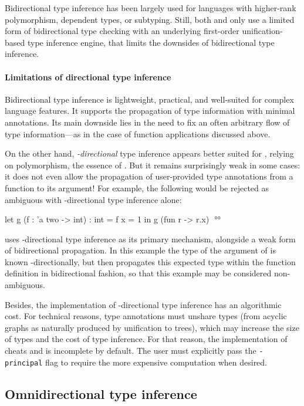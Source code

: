\documentclass[acmsmall,screen,nonacm,review]{acmart}
\begin{document}
Bidirectional type inference has been largely used for languages with
higher-rank polymorphism, dependent types, or subtyping.  Still, both \OCaml
and \Haskell only use a limited form of bidirectional type checking with an
underlying first-order unification-based type inference engine, that limits
the downsides of bidirectional type inference.


\paragraph{Limitations of directional type inference}

Bidirectional type inference is lightweight, practical, and well-suited for
complex language features. It supports the propagation of type information with
minimal annotations. Its main downside lies in the need to fix an often
arbitrary flow of type information---as in the case of function applications
discussed above.

On the other hand, \emph{\Geninst-directional} type inference appears better
suited for \ML, relying on polymorphism, the essence of \ML. But it remains
surprisingly weak in some cases: it does not even allow the propagation of
user-provided type annotations from a function to its argument! For example,
the following would be rejected as ambiguous with \geninst-directional type
inference alone:
\begin{program}[input]
let g (f : 'a two -> int) : int = f {x = 1} in g (fun r -> r.x) $
$ °°
\end{program}

\OCaml uses \geninst-directional type inference as its primary mechanism, alongside
a weak form of bidirectional propagation. In this example the type
of the argument of  is known \Geninst-directionally, but \OCaml then
propagates this expected type within the function definition in bidirectional
fashion, so that this example may be considered non-ambiguous.

Besides, the implementation of \geninst-directional type inference has an
algorithmic cost. For technical reasons, type annotations must unshare
types (from acyclic graphs as naturally produced by unification to trees),
which may increase the size of types and the cost of type inference. For
that reason, the implementation of \OCaml cheats and is incomplete by
default. The user must explicitly pass the \texttt{\small -principal} flag to
require the more expensive computation when desired.

\subsection{Omnidirectional type inference}
\end{document}
